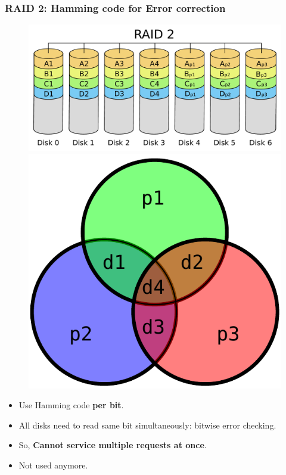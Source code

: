 \documentclass{beamer}
\begin{document}
\begin{frame}
    \frametitle{RAID 2: Hamming code for Error correction}
    \begin{figure}
    \includegraphics[height=0.3\paperwidth]{RAID2.pdf}
    \includegraphics[height=0.3\paperwidth]{hamming.pdf}
    \end{figure}
    \begin{itemize}
        \item Use Hamming code \textbf{per bit}. \pause
        \item All disks need to read same bit simultaneously: bitwise error checking. \pause
        \item So, \textbf{Cannot service multiple requests at once}. \pause
        \item Not used anymore.
    \end{itemize}
\end{frame}
\end{document}
